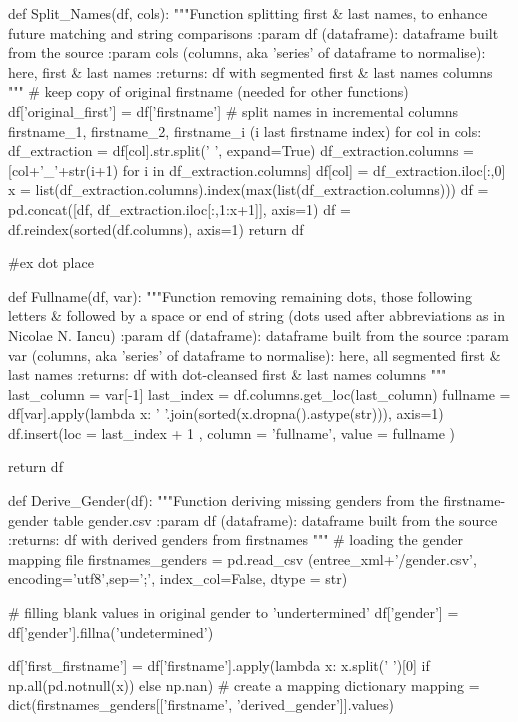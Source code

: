 \documentclass[a4paper,12pt,twoside]{book}
\begin{document}
\begin{python}
def Split_Names(df, cols):
  """Function splitting first & last names, to enhance future matching and string comparisons
    :param df (dataframe): dataframe built from the source
    :param cols (columns, aka 'series' of dataframe to normalise): here, first & last names
    :returns: df with segmented first & last names columns
  """
  # keep copy of original firstname (needed for other functions)
  df['original_first'] = df['firstname']
  # split names in incremental columns firstname_1, firstname_2, firstname_i (i last firstname index)
  for col in cols:
    df_extraction = df[col].str.split(' ', expand=True)
    df_extraction.columns = [col+'_'+str(i+1) for i in df_extraction.columns]
    df[col] = df_extraction.iloc[:,0]
    x = list(df_extraction.columns).index(max(list(df_extraction.columns)))
    df = pd.concat([df, df_extraction.iloc[:,1:x+1]], axis=1)
    df = df.reindex(sorted(df.columns), axis=1)
    return df

#ex dot place


def Fullname(df, var):
  """Function removing remaining dots, those following letters & followed by a space or end of string (dots used after abbreviations as in Nicolae N. Iancu)
    :param df (dataframe): dataframe built from the source
    :param var (columns, aka 'series' of dataframe to normalise): here, all segmented first & last names
    :returns: df with dot-cleansed first & last names columns
  """
  last_column = var[-1]
  last_index = df.columns.get_loc(last_column)
  fullname = df[var].apply(lambda x: ' '.join(sorted(x.dropna().astype(str))), axis=1)
  df.insert(loc = last_index + 1 , column = 'fullname', value = fullname )
  
  return df

def Derive_Gender(df):
  """Function deriving missing genders from the firstname-gender table gender.csv
  :param df (dataframe): dataframe built from the source
  :returns: df with derived genders from firstnames
  """
  # loading the gender mapping file
  firstnames_genders = pd.read_csv (entree_xml+'/gender.csv', encoding='utf8',sep=';', index_col=False, dtype = str)
  
  # filling blank values in original gender to 'undertermined'
  df['gender'] = df['gender'].fillna('undetermined')

  df['first_firstname'] = df['firstname'].apply(lambda x: x.split(' ')[0] if np.all(pd.notnull(x)) else np.nan)  
  # create a mapping dictionary
  mapping = dict(firstnames_genders[['firstname', 'derived_gender']].values)
  

\end{python}
\end{document}
